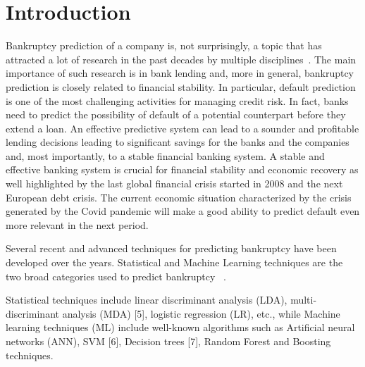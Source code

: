 \section{Introduction}

\label{sec:intro}

Bankruptcy prediction of a company is, not surprisingly, a topic that
has attracted a lot of research in the past decades by multiple disciplines~\cite{altman-bankruptcy-17,kumar-review-07,chen-bankruptcy-11,lee-bankruptcy-13,erdogan-bankruptcy-13,cho-bankruptcy-10,wang-bankruptcy-11,Altman-8,Ohlson-9,Begley-10,Lee-10a,Fernandez-11,Odom-13,Atiya-15,Wang-16}.
The main importance of such research is in bank lending and, more in general, bankruptcy prediction is closely related to financial stability.
In particular, default prediction is one of the most challenging activities for managing credit risk.
In fact, banks need to predict the possibility of default of a potential counterpart before they extend a loan.
An effective predictive system can lead to a sounder and profitable lending decisions leading to significant savings for the banks and the companies and, most importantly, to a stable financial banking system.
A stable and effective banking system is crucial for
financial stability and economic recovery as well highlighted by the last global financial crisis started in 2008 and the next European debt crisis.
The current economic situation characterized by the crisis generated by the Covid pandemic will make a good ability to predict default even more relevant in the next period.


Several recent and advanced techniques for predicting bankruptcy have been developed  over the years. Statistical and Machine Learning techniques are the two broad categories used to predict bankruptcy ~\cite{altman-bankruptcy-17,kumar-review-07,Atiya-15,Wang-16}.

Statistical techniques include linear discriminant analysis (LDA), multi-discriminant analysis (MDA) [5], logistic regression (LR), etc., while Machine learning techniques (ML) include well-known algorithms such as Artificial neural networks (ANN), SVM [6], Decision trees [7], Random Forest and Boosting techniques. \\



